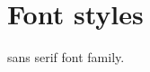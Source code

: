 \documentclass[a4paper,12pt]{article}
\begin{document}
	\section*{Font styles}
	\textsf{sans serif} font family.
		
\end{document}
